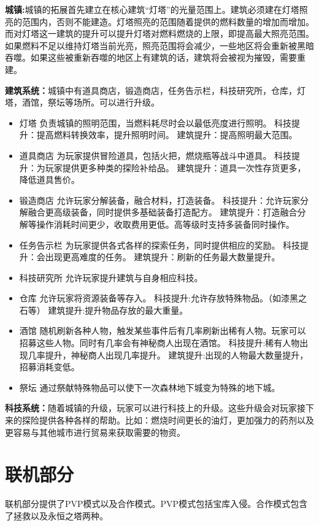 \documentclass[UTF8,AutoFakeBold=1,AutoFakeSlant,zihao=-4]{cucthesis}
\begin{document}
\textbf{城镇:}城镇的拓展首先建立在核心建筑“灯塔”的光量范围上。建筑必须建在灯塔照亮的范围内，否则不能建造。灯塔照亮的范围随着提供的燃料数量的增加而增加。而对灯塔这一建筑的提升可以提升灯塔对燃料燃烧的上限，即提高最大照亮范围。如果燃料不足以维持灯塔当前光亮，照亮范围将会减少，一些地区将会重新被黑暗吞噬。如果这些被重新吞噬的地区上有建筑的话，建筑将会被视为摧毁，需要重建。

\textbf{建筑系统：}城镇中有道具商店，锻造商店，任务告示栏，科技研究所，仓库，灯塔，酒馆，祭坛等场所。可以进行升级。


\begin{itemize}
    \item 灯塔
    负责城镇的照明范围，当燃料耗尽时会以最低亮度进行照明。
    科技提升：提高燃料转换效率，提升照明时间。
    建筑提升：提高照明最大范围。
    \item 道具商店
    为玩家提供冒险道具，包括火把，燃烧瓶等战斗中道具。
    科技提升：为玩家提供更多种类的探险补给品。
    建筑提升：道具一次性存货更多，降低道具售价。
    \item 锻造商店
    允许玩家分解装备，融合材料，打造装备。
    科技提升：允许玩家分解融合更高级装备，同时提供多基础装备打造配方。
    建筑提升：打造融合分解等操作消耗时间更少，收取费用更低。高等级时支持多装备同时操作。
    \item 任务告示栏
    为玩家提供各式各样的探索任务，同时提供相应的奖励。
    科技提升：会出现更高难度的任务。
    建筑提升：刷新的任务最大数量提升。
    \item 科技研究所
    允许玩家提升建筑与自身相应科技。
    \item 仓库
    允许玩家将资源装备等存入。
    科技提升:允许存放特殊物品。（如漆黑之石等）
    建筑提升:提升物品存放的最大重量。
    \item 酒馆
    随机刷新各种人物，触发某些事件后有几率刷新出稀有人物。玩家可以招募这些人物。同时有几率会有神秘商人出现在酒馆。
    科技提升:稀有人物出现几率提升，神秘商人出现几率提升。
    建筑提升:出现的人物最大数量提升，招募消耗变低。
    \item 祭坛
    通过祭献特殊物品可以使下一次森林地下城变为特殊的地下城。
\end{itemize}

\textbf{科技系统：}随着城镇的升级，玩家可以进行科技上的升级。这些升级会对玩家接下来的探险提供各种各样的帮助。比如：燃烧时间更长的油灯，更加强力的药剂以及更容易与其他城市进行贸易来获取需要的物资。


\section{联机部分}
联机部分提供了PVP模式以及合作模式。PVP模式包括宝库入侵。合作模式包含了拯救以及永恒之塔两种。
\end{document}

